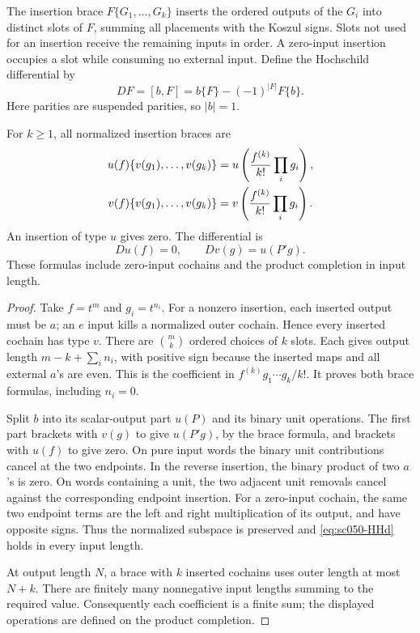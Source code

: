 The insertion brace \(F\{G_1,\ldots,G_k\}\) inserts the ordered
outputs of the \(G_i\) into distinct slots of \(F\), summing all
placements with the Koszul signs. Slots not used for an insertion
receive the remaining inputs in order. A zero-input insertion
occupies a slot while consuming no external input.
Define the Hochschild differential by
\[
 D F=[b,F]=b\{F\}-(-1)^{|F|}F\{b\}.
\]
Here parities are suspended parities, so \(|b|=1\).

\begin{theorem}\label{thm:sc050-braces}
For \(k\ge1\), all normalized insertion braces are
\begin{align}
 u(f)\{v(g_1),\ldots,v(g_k)\}
     &=u\left(\frac{f^{(k)}}{k!}\prod_i g_i\right),\notag\\
 v(f)\{v(g_1),\ldots,v(g_k)\}
     &=v\left(\frac{f^{(k)}}{k!}\prod_i g_i\right).
 \label{eq:sc050-braces}
\end{align}
An insertion of type \(u\) gives zero. The differential is
\begin{equation}\label{eq:sc050-HHd}
 Du(f)=0,\qquad Dv(g)=u(P'g).
\end{equation}
These formulas include zero-input cochains and the product
completion in input length.
\end{theorem}
\begin{proof}
Take \(f=t^m\) and \(g_i=t^{n_i}\).
For a nonzero insertion, each inserted output must be \(a\);
an \(e\) input kills a normalized outer cochain. Hence every
inserted cochain has type \(v\).
There are \(\binom{m}{k}\) ordered choices of \(k\) slots.
Each gives output length \(m-k+\sum_i n_i\), with positive
sign because the inserted maps and all external \(a\)'s are
even. This is the coefficient in
\(f^{(k)}g_1\cdots g_k/k!\). It proves both brace formulas,
including \(n_i=0\).

Split \(b\) into its scalar-output part \(u(P)\) and its binary
unit operations. The first part brackets with \(v(g)\) to give
\(u(P'g)\), by the brace formula, and brackets with \(u(f)\)
to give zero. On pure input words the binary unit contributions
cancel at the two endpoints. In the reverse insertion, the
binary product of two \(a\)'s is zero.
On words containing a unit, the two adjacent unit removals
cancel against the corresponding endpoint insertion. For a
zero-input cochain, the same two endpoint terms are the left
and right multiplication of its output, and have opposite
signs. Thus the normalized subspace is preserved and
\eqref{eq:sc050-HHd} holds in every input length.

At output length \(N\), a brace with \(k\) inserted cochains
uses outer length at most \(N+k\). There are finitely many
nonnegative input lengths summing to the required value.
Consequently each coefficient is a finite sum; the displayed
operations are defined on the product completion.
\end{proof}

